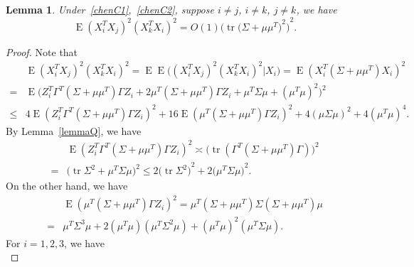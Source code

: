 \documentclass[review]{elsarticle}
\DeclareMathOperator{\mytr}{tr}
\DeclareMathOperator{\myE}{E}
\theoremstyle{plain}
\newtheorem{lemma}{Lemma}
\theoremstyle{definition}
\theoremstyle{remark}
\begin{document}
\begin{lemma}\label{smallLemma2}
    Under~\eqref{chenC1},~\eqref{chenC2}, suppose $i\neq j$, $i\neq k$, $j\neq k$, we have
    \begin{equation}\label{eq:2}
            \myE{(X_i^T X_j)}^2{(X_k^T X_i)}^2=
             O(1){\Big(\mytr {\big(\Sigma+\mu\mu^T\big)}^2\Big)}^2.
    \end{equation}
\end{lemma}
\begin{proof}
Note that
    \begin{equation*}
        \begin{aligned}
            &\myE{(X_i^T X_j)}^2{(X_k^T X_i)}^2
            = 
            \myE\myE\big({(X_i^T X_j)}^2{(X_k^T X_i)}^2| X_i\big)
            =
            \myE{(X_i^T (\Sigma+\mu\mu^T) X_i )}^2\\
            =&
            \myE\Big(Z_i^T \Gamma^T (\Sigma+\mu\mu^T) \Gamma Z_i+ 2\mu^T (\Sigma+\mu\mu^T)\Gamma Z_i 
            +\mu^T \Sigma \mu +(\mu^T\mu)^2 \Big)^2\\
            \leq&
            4\myE(Z_i^T \Gamma^T (\Sigma+\mu\mu^T) \Gamma Z_i)^2+ 16\myE(\mu^T (\Sigma+\mu\mu^T)\Gamma Z_i)^2 
            +4(\mu \Sigma \mu)^2 +4(\mu^T\mu)^4.
        \end{aligned}
    \end{equation*}
    By Lemma~\eqref{lemmaQ}, we have
    \begin{equation*}
        \begin{aligned}
            &\myE(Z_i^T \Gamma^T (\Sigma+\mu\mu^T) \Gamma Z_i)^2
            \asymp
\big(\mytr (\Gamma^T (\Sigma+\mu\mu^T)\Gamma)\big)^2\\
            =&
\big(\mytr \Sigma^2+\mu^T\Sigma \mu\big)^2
            \leq
            2{\big(\mytr \Sigma^2\big)}^2+2{\big(\mu^T\Sigma \mu\big)}^2.
        \end{aligned}
    \end{equation*}
    On the other hand, we have
    \begin{equation*}
        \begin{aligned}
            &\myE(\mu^T (\Sigma+\mu\mu^T)\Gamma Z_i)^2
            =
\mu^T (\Sigma+\mu\mu^T)\Sigma (\Sigma+\mu\mu^T)\mu\\
            =&\mu^T \Sigma^3 \mu+2(\mu^T\mu)(\mu^T\Sigma^2\mu)+{(\mu^T\mu)}^2(\mu^T\Sigma\mu).
        \end{aligned}
    \end{equation*}
    For $i=1,2,3$, we have
    \begin{equation*}

\end{equation*}
\end{proof}
\end{document}
